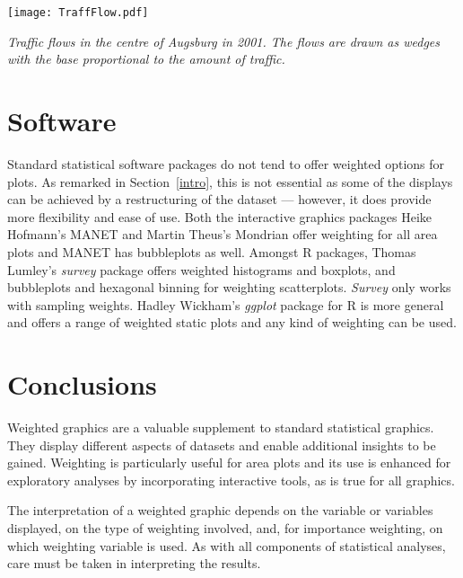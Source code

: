 \documentclass{svmult}
\begin{document}
\begin{center}
      \texttt{[image: TraffFlow.pdf]}
      \caption{\label{traffic}\em Traffic flows in the centre of Augsburg in 2001. The flows are drawn as wedges with the base proportional to the amount of traffic. }
      \end{center}

\section{Software}
\label{sw}
Standard statistical software packages do not tend to offer weighted options for plots.  As remarked in Section~\ref{intro}, this is not essential as some of the displays can be achieved by a restructuring of the dataset --- however, it does provide more flexibility and ease of use.  Both the interactive graphics packages Heike Hofmann's MANET \citep{hofmann:2000a} and Martin Theus's Mondrian \citep{theus:2005} offer weighting for all area plots and MANET has bubbleplots as well.  Amongst R packages, Thomas Lumley's \textit{survey} package offers weighted histograms and boxplots, and bubbleplots and hexagonal binning for weighting scatterplots.  \textit{Survey} only works with sampling weights.  Hadley Wickham's \textit{ggplot} package for R is more general and offers a range of weighted static plots and any kind of weighting can be used.

\section{Conclusions}
\label{conc}
Weighted graphics are a valuable supplement to standard statistical graphics.  They display different aspects of datasets and enable additional insights to be gained.  Weighting is particularly useful for area plots and its use is enhanced for exploratory analyses by incorporating interactive tools, as is true for all graphics.

The interpretation of a weighted graphic depends on the variable or variables displayed, on the type of weighting involved, and, for importance weighting, on which weighting variable is used.  As with all components of statistical analyses, care must be taken in interpreting the results.



\end{document}
